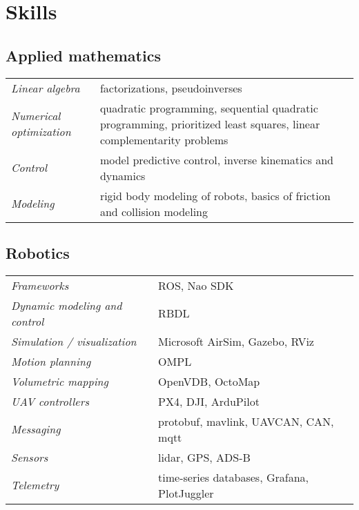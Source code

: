 \documentclass[a4paper,10pt]{report}
\begin{document}
\vspace{0.2cm}
\section{Skills}
\begin{adjustwidth}{0.5cm}{0pt}
%
\subsection{Applied mathematics}
\begin{adjustwidth}{0.5cm}{0pt}
    \begin{tabularx}{\linewidth}{l X}
        {\it Linear algebra}            &   factorizations, pseudoinverses \\
        {\it Numerical optimization}    &   quadratic programming, sequential quadratic programming,
                                            prioritized least squares, linear complementarity problems \\
        {\it Control}                   &   model predictive control, inverse kinematics and dynamics \\
        {\it Modeling}                  &   rigid body modeling of robots, basics of friction and
                                            collision modeling
    \end{tabularx}
\end{adjustwidth}

\vspace{0.2cm}
\subsection{Robotics}
\begin{adjustwidth}{0.5cm}{0pt}
    \begin{tabularx}{\linewidth}{l X}
        {\it Frameworks}                    & ROS, Nao SDK \\
        {\it Dynamic modeling and control}  & RBDL \\
        {\it Simulation / visualization}    & Microsoft AirSim, Gazebo, RViz \\
        {\it Motion planning}               & OMPL \\
        {\it Volumetric mapping}            & OpenVDB, OctoMap \\
        {\it UAV controllers}               & PX4, DJI, ArduPilot \\
        {\it Messaging}                     & protobuf, mavlink, UAVCAN, CAN, mqtt \\
        {\it Sensors}                       & lidar, GPS, ADS-B \\
        {\it Telemetry}                     & time-series databases, Grafana, PlotJuggler
    \end{tabularx}
\end{adjustwidth}


\end{adjustwidth}
\end{document}
